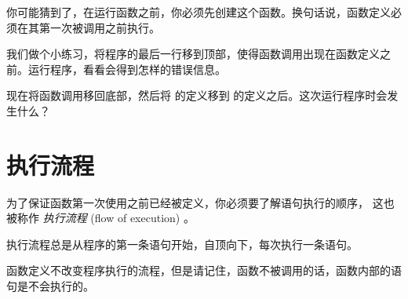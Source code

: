 
你可能猜到了，在运行函数之前，你必须先创建这个函数。换句话说，函数定义必须在其第一次被调用之前执行。


我们做个小练习，将程序的最后一行移到顶部，使得函数调用出现在函数定义之前。运行程序，看看会得到怎样的错误信息。



现在将函数调用移回底部，然后将  的定义移到  的定义之后。这次运行程序时会发生什么？


%
\section{执行流程}
  


为了保证函数第一次使用之前已经被定义，你必须要了解语句执行的顺序，
这也被称作 {\em 执行流程} (flow of execution) 。


执行流程总是从程序的第一条语句开始，自顶向下，每次执行一条语句。


函数定义不改变程序执行的流程，但是请记住，函数不被调用的话，函数内部的语句是不会执行的。


